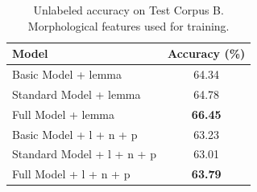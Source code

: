 \documentclass[11pt,letterpaper]{article}
\begin{document}
\begin{table}
\begin{center}
  \begin{tabular}{ l || c }
  \hline
  Model & Accuracy (\%)\\
  \hline
  Basic Model + lemma & 64.34 \\
  Standard Model + lemma & 64.78 \\
  Full Model + lemma & \textbf{66.45} \\
  \hline
  Basic Model + l + n + p& 63.23 \\
  Standard Model + l + n + p& 63.01 \\
  Full Model + l + n + p& \textbf{63.79} \\
  \hline
   \end{tabular}
\end{center}
\caption{Unlabeled accuracy on Test Corpus B. Morphological features used for training.}
\label{Five}
\end{table}
\end{document}
